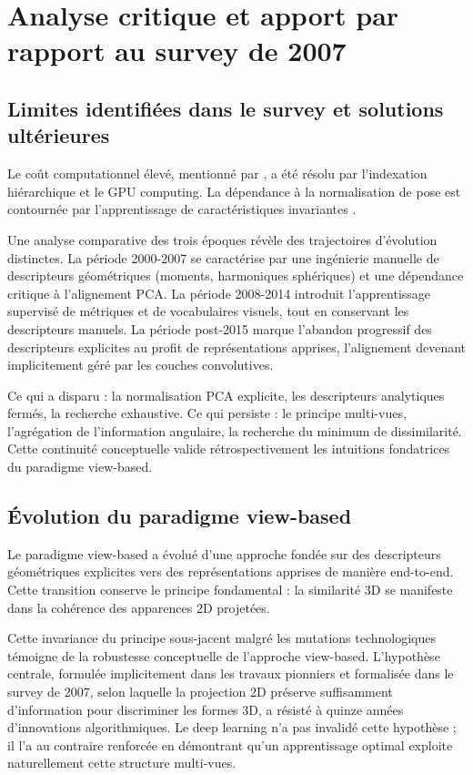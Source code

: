 \documentclass[11pt,a4paper,oneside]{report}
\begin{document}
\section{Analyse critique et apport par rapport au survey de 2007}

\subsection{Limites identifiées dans le survey et solutions ultérieures}

Le coût computationnel élevé, mentionné par \cite{tangelder2007survey}, a été résolu par l'indexation hiérarchique et le GPU computing. La dépendance à la normalisation de pose est contournée par l'apprentissage de caractéristiques invariantes \cite{su2015multi}.

Une analyse comparative des trois époques révèle des trajectoires d'évolution distinctes. La période 2000-2007 se caractérise par une ingénierie manuelle de descripteurs géométriques (moments, harmoniques sphériques) et une dépendance critique à l'alignement PCA. La période 2008-2014 introduit l'apprentissage supervisé de métriques et de vocabulaires visuels, tout en conservant les descripteurs manuels. La période post-2015 marque l'abandon progressif des descripteurs explicites au profit de représentations apprises, l'alignement devenant implicitement géré par les couches convolutives.

Ce qui a disparu : la normalisation PCA explicite, les descripteurs analytiques fermés, la recherche exhaustive. Ce qui persiste : le principe multi-vues, l'agrégation de l'information angulaire, la recherche du minimum de dissimilarité. Cette continuité conceptuelle valide rétrospectivement les intuitions fondatrices du paradigme view-based.

\subsection{Évolution du paradigme view-based}

Le paradigme view-based a évolué d'une approche fondée sur des descripteurs géométriques explicites vers des représentations apprises de manière end-to-end. Cette transition conserve le principe fondamental : la similarité 3D se manifeste dans la cohérence des apparences 2D projetées.

Cette invariance du principe sous-jacent malgré les mutations technologiques témoigne de la robustesse conceptuelle de l'approche view-based. L'hypothèse centrale, formulée implicitement dans les travaux pionniers et formalisée dans le survey de 2007, selon laquelle la projection 2D préserve suffisamment d'information pour discriminer les formes 3D, a résisté à quinze années d'innovations algorithmiques. Le deep learning n'a pas invalidé cette hypothèse ; il l'a au contraire renforcée en démontrant qu'un apprentissage optimal exploite naturellement cette structure multi-vues.
\end{document}
